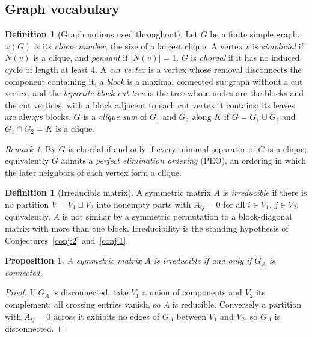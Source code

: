 \documentclass[11pt]{article}
\theoremstyle{plain}
\newtheorem{proposition}[theorem]{Proposition}
\theoremstyle{definition}
\newtheorem{definition}[theorem]{Definition}
\theoremstyle{remark}
\newtheorem{remark}[theorem]{Remark}
\begin{document}
\begin{aiblock}
\subsection{Graph vocabulary}

\begin{definition}[Graph notions used throughout]\label{def:graphvocab}
Let $G$ be a finite simple graph. $\omega(G)$ is its \emph{clique number}, the size of a largest
clique. A vertex $v$ is \emph{simplicial} if $N(v)$ is a clique, and \emph{pendant} if
$|N(v)|=1$. $G$ is \emph{chordal} if it has no induced cycle of length at least $4$. A \emph{cut vertex} is a vertex whose removal disconnects the component containing it,
a \emph{block} is a maximal connected subgraph without a cut vertex, and the \emph{bipartite
block-cut tree} is the tree whose nodes are the blocks and the cut vertices, with a block adjacent to
each cut vertex it contains; its leaves are always blocks. $G$ is a \emph{clique sum} of $G_1$ and
$G_2$ along $K$ if $G=G_1\cup G_2$ and $G_1\cap G_2=K$ is a clique.
\end{definition}

\begin{remark}
By \cite{Dirac} $G$ is chordal if and only if every minimal separator of $G$ is a clique; equivalently \cite{Fulkerson} $G$ admits a
\emph{perfect elimination ordering} (PEO), an ordering in which the later neighbors of each vertex
form a clique.
\end{remark}

\begin{definition}[Irreducible matrix]\label{def:irred}
A symmetric matrix $A$ is \emph{irreducible} if there is no partition $V=V_1\sqcup V_2$ into nonempty
parts with $A_{ij}=0$ for all $i\in V_1$, $j\in V_2$; equivalently, $A$ is not similar by a symmetric
permutation to a block-diagonal matrix with more than one block. Irreducibility is the standing
hypothesis of Conjectures~\ref{conj:2} and~\ref{conj:1}.
\end{definition}

\begin{proposition}\label{prop:irred-connected}
A symmetric matrix $A$ is irreducible if and only if $G_A$ is connected.
\end{proposition}
\begin{proof}
If $G_A$ is disconnected, take $V_1$ a union of components and $V_2$ its complement: all crossing
entries vanish, so $A$ is reducible. Conversely a partition with $A_{ij}=0$ across it exhibits no
edges of $G_A$ between $V_1$ and $V_2$, so $G_A$ is disconnected.
\end{proof}


\end{aiblock}
\end{document}
